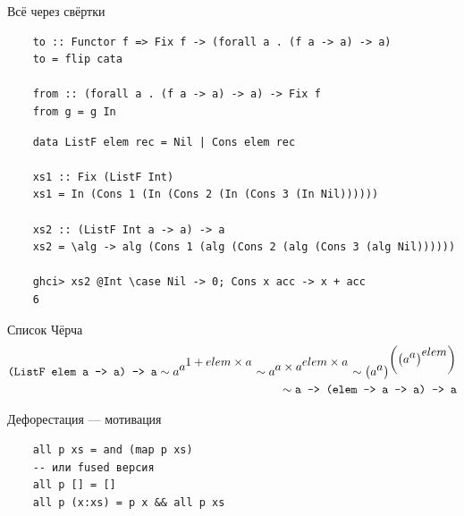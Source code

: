     \begin{frame}[fragile]{Всё через свёртки}
        \pause
        \begin{verbatim}
    to :: Functor f => Fix f -> (forall a . (f a -> a) -> a)
    to = flip cata

    from :: (forall a . (f a -> a) -> a) -> Fix f
    from g = g In
        \end{verbatim}
        \pause\vspace{1em}
        \begin{verbatim}
    data ListF elem rec = Nil | Cons elem rec

    xs1 :: Fix (ListF Int)
    xs1 = In (Cons 1 (In (Cons 2 (In (Cons 3 (In Nil))))))

    xs2 :: (ListF Int a -> a) -> a
    xs2 = \alg -> alg (Cons 1 (alg (Cons 2 (alg (Cons 3 (alg Nil))))))

    ghci> xs2 @Int \case Nil -> 0; Cons x acc -> x + acc
    6
        \end{verbatim}
    \end{frame}

    \begin{frame}[fragile]{Список Чёрча}
        \pause
        \begin{align*}
            \text{\texttt{(ListF elem a -> a) -> a}}
            \sim a^{\displaystyle a^{\displaystyle 1 + elem\times a}}
            \sim a^{\displaystyle a\times a^{\displaystyle elem\times a}}
            \sim \left( a^{\displaystyle a} \right)^{\displaystyle \left(\left( a^{\displaystyle a}\right)^{\displaystyle elem}\right)} \\
            \sim \text{\texttt{a -> (elem -> a -> a) -> a}}
        \end{align*}
    \end{frame}

    \begin{frame}[fragile]{Дефорестация --- мотивация}
        \pause
        \begin{verbatim}
    all p xs = and (map p xs)
    -- или fused версия
    all p [] = []
    all p (x:xs) = p x && all p xs
        \end{verbatim}
    \end{frame}

